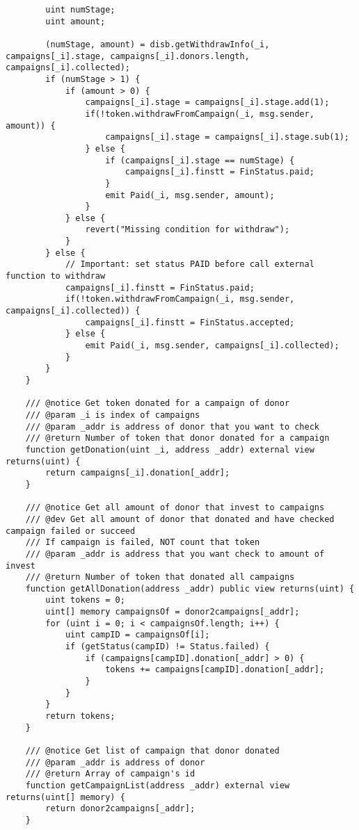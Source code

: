 \documentclass[../main-report.tex]{subfiles}
\begin{document}
\begin{lstlisting}
        uint numStage;
        uint amount;

        (numStage, amount) = disb.getWithdrawInfo(_i, campaigns[_i].stage, campaigns[_i].donors.length, campaigns[_i].collected);
        if (numStage > 1) {
            if (amount > 0) {
                campaigns[_i].stage = campaigns[_i].stage.add(1);
                if(!token.withdrawFromCampaign(_i, msg.sender, amount)) {
                    campaigns[_i].stage = campaigns[_i].stage.sub(1);
                } else {
                    if (campaigns[_i].stage == numStage) {
                        campaigns[_i].finstt = FinStatus.paid;
                    }
                    emit Paid(_i, msg.sender, amount);
                }
            } else {
                revert("Missing condition for withdraw");
            }
        } else {
            // Important: set status PAID before call external function to withdraw
            campaigns[_i].finstt = FinStatus.paid;
            if(!token.withdrawFromCampaign(_i, msg.sender, campaigns[_i].collected)) {
                campaigns[_i].finstt = FinStatus.accepted;
            } else {
                emit Paid(_i, msg.sender, campaigns[_i].collected);
            }
        }
    }

    /// @notice Get token donated for a campaign of donor
    /// @param _i is index of campaigns
    /// @param _addr is address of donor that you want to check
    /// @return Number of token that donor donated for a campaign
    function getDonation(uint _i, address _addr) external view returns(uint) {
        return campaigns[_i].donation[_addr];
    }

    /// @notice Get all amount of donor that invest to campaigns
    /// @dev Get all amount of donor that donated and have checked campaign failed or succeed
    /// If campaign is failed, NOT count that token
    /// @param _addr is address that you want check to amount of invest
    /// @return Number of token that donated all campaigns
    function getAllDonation(address _addr) public view returns(uint) {
        uint tokens = 0;
        uint[] memory campaignsOf = donor2campaigns[_addr];
        for (uint i = 0; i < campaignsOf.length; i++) {
            uint campID = campaignsOf[i];
            if (getStatus(campID) != Status.failed) {
                if (campaigns[campID].donation[_addr] > 0) {
                    tokens += campaigns[campID].donation[_addr];
                }
            }
        }
        return tokens;
    }

    /// @notice Get list of campaign that donor donated
    /// @param _addr is address of donor
    /// @return Array of campaign's id
    function getCampaignList(address _addr) external view returns(uint[] memory) {
        return donor2campaigns[_addr];
    }


\end{lstlisting}
\end{document}
